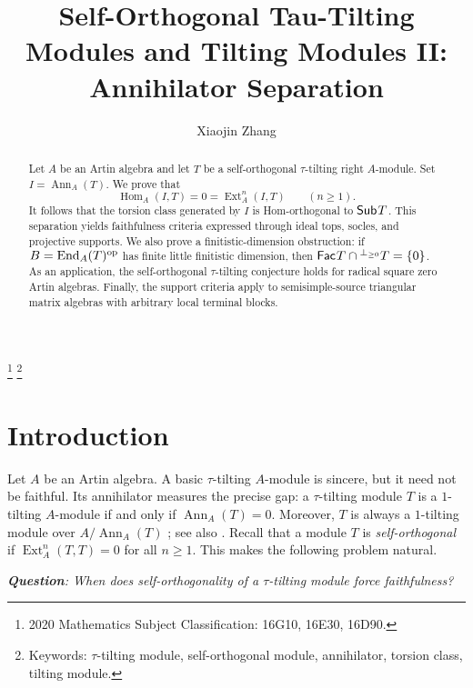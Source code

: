 \documentclass[a4paper,reqno]{amsart}
\theoremstyle{definition}
\newcommand{\Ext}{\operatorname{Ext}\nolimits}
\newcommand{\Hom}{\operatorname{Hom}\nolimits}
\newcommand{\End}{\operatorname{End}\nolimits}
\newcommand{\Ann}{\operatorname{Ann}\nolimits}
\newcommand{\Fac}{\mathsf{Fac}\hspace{.01in}}
\newcommand{\Sub}{\mathsf{Sub}\hspace{.01in}}
\numberwithin{equation}{section}
\begin{document}
\title[Annihilator separation]{Self-Orthogonal Tau-Tilting Modules and Tilting Modules II: Annihilator Separation}
\thanks{2020 Mathematics Subject Classification: 16G10, 16E30, 16D90.}
\thanks{Keywords: $\tau$-tilting module, self-orthogonal module,
annihilator, torsion class, tilting module.}

\author{Xiaojin Zhang}
\address{X. Zhang: School of Mathematics and Statistics, Jiangsu Normal
University, Xuzhou, 221116, P. R. China}

\begin{abstract}
Let $A$ be an Artin algebra and let $T$ be a self-orthogonal
$\tau$-tilting right $A$-module. Set $I=\Ann_A(T)$. We prove that
\[
       \Hom_A(I,T)=0=\Ext_A^n(I,T)\qquad(n\geq 1).
\]
It follows that the torsion class generated by $I$ is Hom-orthogonal
to $\Sub T$. This separation yields faithfulness criteria expressed
through ideal tops, socles, and projective supports. We also prove a
finitistic-dimension obstruction: if
$B=\End_A(T)^{\rm op}$ has finite little finitistic dimension, then
$\Fac T\cap{}^{\perp_{\geq0}}T=\{0\}$. As an application, the
self-orthogonal $\tau$-tilting conjecture holds for
radical square zero Artin algebras.
Finally, the support criteria apply to semisimple-source triangular
matrix algebras with arbitrary local terminal blocks.
\end{abstract}

\maketitle

\section{Introduction}

Let $A$ be an Artin algebra. A basic $\tau$-tilting $A$-module is
sincere, but it need not be faithful. Its annihilator measures the
precise gap: a $\tau$-tilting module $T$ is a $1$-tilting
$A$-module if and only if $\Ann_A(T)=0$. Moreover, $T$ is always a
$1$-tilting module over $A/\Ann_A(T)$
\cite[Lemma~2.4 and Proposition~2.5]{CLZZ}; see also \cite{AIR}. Recall that a module $T$ is \emph{self-orthogonal} if
$\Ext_A^n(T,T)=0$ for all $n\geq 1$.
This makes the following problem natural.

\medskip
\noindent
\emph{{\bf Question}: When does self-orthogonality of a $\tau$-tilting module force
faithfulness?}
\medskip
\end{document}
